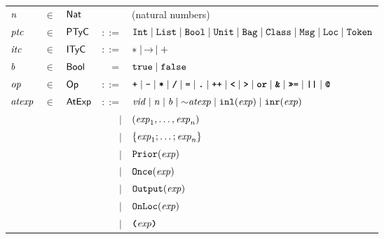 \documentclass[final]{article}
\begin{document}
\begin{figure}[t]
\begin{small}
\begin{center}
  \begin{tabular}{lllrl}
    $\mathit{n}$
    & $\in$
    & $\mathsf{Nat}$
    &
    & (natural numbers)
    \\




    $\mathit{ptc}$
    & $\in$
    & $\mathsf{PTyC}$
    & $::=$
    & $\mathtt{Int}
    \mid\mathtt{List}
    \mid\mathtt{Bool}
    \mid\mathtt{Unit}
    \mid\mathtt{Bag}
    \mid\mathtt{Class}
    \mid\mathtt{Msg}
    \mid\mathtt{Loc}
    \mid\mathtt{Token}$
    \\

    $\mathit{itc}$
    & $\in$
    & $\mathsf{ITyC}$
    & $::=$
    & $*\mid\,\mathrel{\rightarrow}\,\mid+$
    \\

    $\mathit{b}$
    & $\in$
    & $\mathsf{Bool}$
    & $=$
    & $\mathtt{true}\mid\mathtt{false}$
    \\

    $\mathit{op}$
    & $\in$
    & $\mathsf{Op}$
    & $::=$
    & $\textbf{\texttt{+}}
    \mid\textbf{\texttt{-}}
    \mid\textbf{\texttt{*}}
    \mid\textbf{\texttt{/}}
    \mid\textbf{\texttt{=}}
    \mid\textbf{\texttt{.}}
    \mid\textbf{\texttt{++}}
    \mid\textbf{\texttt{<}}
    \mid\textbf{\texttt{>}}
    \mid\textbf{\texttt{or}}
    \mid\textbf{\texttt{\&}}
    \mid\textbf{\texttt{>>=}}
    \mid\textbf{\texttt{||}}
    \mid\textbf{\texttt{@}}$
    \\

    $\mathit{atexp}$
    & $\in$
    & $\mathsf{AtExp}$
    & $::=$
    & $\mathit{vid}
    \mid\mathit{n}
    \mid\mathit{b}
    \mid\mbox{$\sim$}\mathit{atexp}
    \mid\mathtt{inl}(\mathit{exp})
    \mid\mathtt{inr}(\mathit{exp})$\\
    &&& $\mid$
    & $(\mathit{exp}_1,\dots,\mathit{exp}_n)$\\
    &&& $\mid$
    & $\{\mathit{exp}_1;\dots;\mathit{exp}_n\}$\\
    &&& $\mid$
    & $\mathtt{Prior}(\mathit{exp})$\\
    &&& $\mid$
    & $\mathtt{Once}(\mathit{exp})$\\
    &&& $\mid$
    & $\mathtt{Output}(\mathit{exp})$\\
    &&& $\mid$
    & $\mathtt{OnLoc}(\mathit{exp})$\\
    &&& $\mid$
    & $\textbf{\texttt{(}}\mathit{exp}\textbf{\texttt{)}}$
    \\


\end{tabular}
\end{center}
\end{small}
\end{figure}
\end{document}
